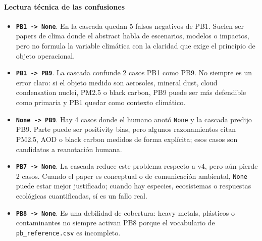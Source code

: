 \paragraph*{Lectura técnica de las confusiones}

\begin{itemize}
\item \textbf{\texttt{PB1 -> None}}. En la cascada quedan 5 falsos negativos de PB1. Suelen ser papers de clima donde el abstract habla de escenarios, modelos o impactos, pero no formula la variable climática con la claridad que exige el principio de objeto operacional.
\item \textbf{\texttt{PB1 -> PB9}}. La cascada confunde 2 casos PB1 como PB9. No siempre es un error claro: si el objeto medido son aerosoles, mineral dust, cloud condensation nuclei, PM2.5 o black carbon, PB9 puede ser más defendible como primaria y PB1 quedar como contexto climático.
\item \textbf{\texttt{None -> PB9}}. Hay 4 casos donde el humano anotó \texttt{None} y la cascada predijo PB9. Parte puede ser positivity bias, pero algunos razonamientos citan PM2.5, AOD o black carbon medidos de forma explícita; esos casos son candidatos a reanotación humana.
\item \textbf{\texttt{PB7 -> None}}. La cascada reduce este problema respecto a v4, pero aún pierde 2 casos. Cuando el paper es conceptual o de comunicación ambiental, \texttt{None} puede estar mejor justificado; cuando hay especies, ecosistemas o respuestas ecológicas cuantificadas, sí es un fallo real.
\item \textbf{\texttt{PB8 -> None}}. Es una debilidad de cobertura: heavy metals, plásticos o contaminantes no siempre activan PB8 porque el vocabulario de \texttt{pb\_reference.csv} es incompleto.
\end{itemize}


